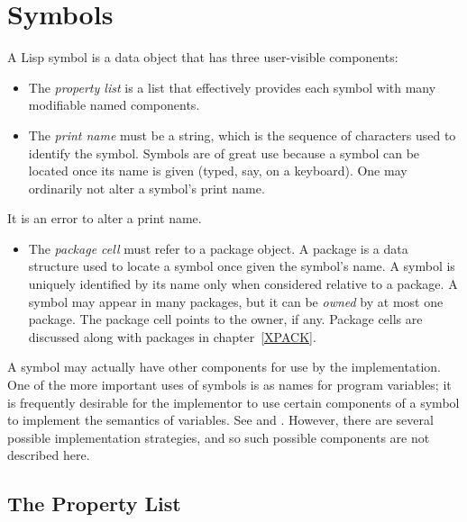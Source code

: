 
\clearpage\def\pagestatus{ULTIMATE}

\ifx \rulang\Undef

\chapter{Symbols}
\label{symbol}

A Lisp symbol is a data object that has three user-visible
components:
\begin{itemize}
\item
The \emph{property list} is a list that effectively provides each symbol
with many modifiable named components.

\item
The \emph{print name} must be a string, which is the sequence of
characters used to identify the symbol.  Symbols are of great use
because a symbol can be located once its name is given
(typed, say, on a keyboard).
One may ordinarily not alter a symbol's print name.
\end{itemize}

It is an error to alter a print name.

\begin{itemize}
\item
The \emph{package cell} must refer to a package object.
A package is a data structure
used to locate a symbol once given the symbol's name.
A symbol is uniquely identified
by its name only when considered relative to a package.  A symbol may
appear in many packages, but it can be \emph{owned} by at most one package.
The package cell points to the owner, if any.
Package cells are discussed along with packages in chapter~\ref{XPACK}.
\end{itemize}

A symbol may actually have other components for use by the
implementation.  One of the more important uses of symbols is as
names for program variables; it is frequently desirable for the
implementor to use certain components of a symbol to implement
the semantics of variables.  See 
and .
However, there are several possible
implementation strategies, and so such possible components are not
described here.

\section{The Property List}

